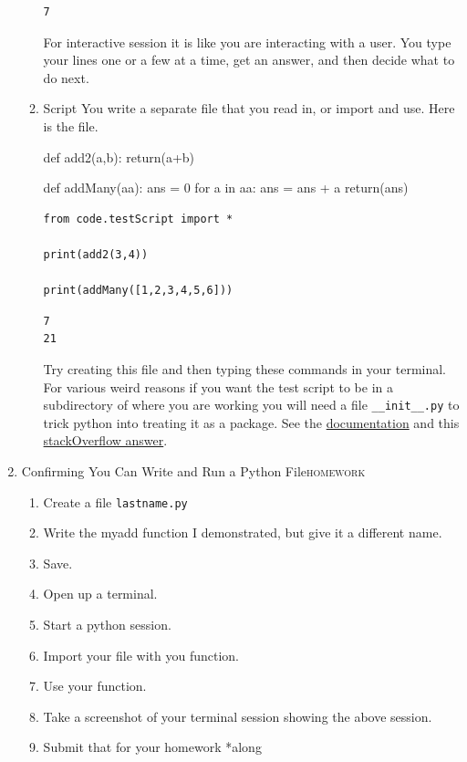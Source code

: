 \documentclass{article}
\begin{document}
\begin{enumerate}
\begin{enumerate}
\begin{verbatim}
7
\end{verbatim}


For interactive session it is like you are interacting with a user. You type your lines one or a few at a time, get an answer, and then decide what to do next. 
\item Script
\label{sec:orgaf0937a}
You write a separate file that you read in, or import and use. Here is the file.

def add2(a,b):
    return(a+b)

def addMany(aa):
    ans = 0
    for a in aa:
        ans = ans + a
    return(ans)

\begin{verbatim}
from code.testScript import *

print(add2(3,4))

print(addMany([1,2,3,4,5,6]))
\end{verbatim}

\begin{verbatim}
7
21
\end{verbatim}


Try creating this file and then typing these commands in your terminal. For various weird reasons if you want the test script to be in a subdirectory of where you are working you will need a file \texttt{\_\_init\_\_.py} to trick python into treating it as a package. See the \href{https://docs.python.org/3/tutorial/modules.html\#packages}{documentation} and this \href{https://stackoverflow.com/questions/1260792/import-a-file-from-a-subdirectory}{stackOverflow answer}.
\end{enumerate}
\item Confirming You Can Write and Run a Python File\hfill{}\textsc{homework}
\label{sec:orgf56a7b8}
\begin{enumerate}
\item Create a file \texttt{lastname.py}
\item Write the myadd function I demonstrated, but give it a different name.
\item Save.
\item Open up a terminal.
\item Start a python session.
\item Import your file with you function.
\item Use your function.
\item Take a screenshot of your terminal session showing the above session.
\item Submit that for your homework *along
\end{enumerate}
\end{enumerate}
\end{document}
